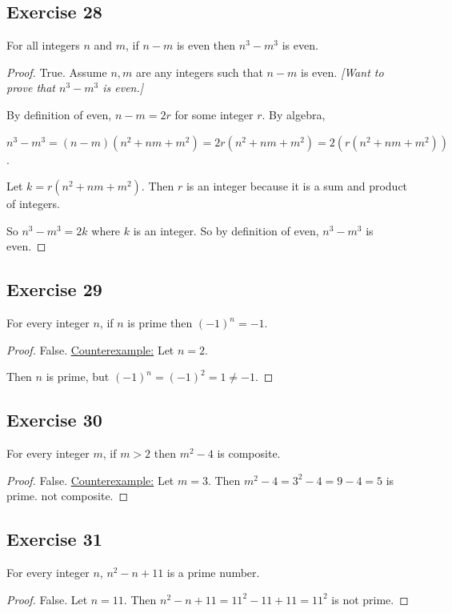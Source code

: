 \documentclass[14pt]{extarticle}
\begin{document}
\subsection{Exercise 28}
For all integers $n$ and $m$, if $n - m$ is even then $n^3 - m^3$ is even.

\begin{proof}
True. Assume $n, m$ are any integers such that $n - m$ is even. {\it [Want to prove that $n^3 - m^3$ is even.]}

By definition of even, $n-m = 2r$ for some integer $r$. By algebra, 

$n^3 - m^3 = (n-m)(n^2 + nm + m^2) = 2r(n^2 + nm + m^2) = 2(r(n^2 + nm + m^2))$.

Let $k = r(n^2 + nm + m^2)$. Then $r$ is an integer because it is a sum and product of integers.

So $n^3 - m^3 = 2k$ where $k$ is an integer. So by definition of even, $n^3 - m^3$ is even.
\end{proof}

\subsection{Exercise 29}
For every integer $n$, if $n$ is prime then $(-1)^n = -1$.

\begin{proof}
False. \underline{Counterexample:} Let $n=2$. 

Then $n$ is prime, but $(-1)^n = (-1)^2 = 1 \neq -1$.
\end{proof}

\subsection{Exercise 30}
For every integer $m$, if $m > 2$ then $m^2 - 4$ is composite.

\begin{proof}
False. \underline{Counterexample:} Let $m = 3$. Then $m^2 - 4 = 3^2 - 4 = 9 - 4 = 5$ is prime. not composite.
\end{proof}

\subsection{Exercise 31}
For every integer $n$, $n^2 - n + 11$ is a prime number.

\begin{proof}
False. Let $n = 11$. Then $n^2 - n + 11 = 11^2 - 11 + 11 = 11^2$ is not prime.
\end{proof}
\end{document}
